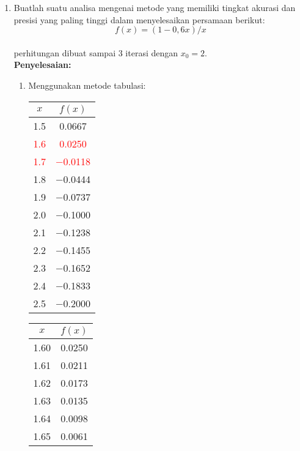 \documentclass{article}
\newcommand{\penyelesaian}{\textbf{Penyelesaian: }}
\begin{document}
\begin{enumerate}
    \item Buatlah suatu analisa mengenai metode yang memiliki tingkat akurasi dan presisi yang paling tinggi dalam menyelesaikan persamaan berikut: \\
    \begin{equation*}
        f(x) = (1 - 0,6x) / x
    \end{equation*} \\
    perhitungan dibuat sampai 3 iterasi dengan $x_0 = 2$. \\
    \penyelesaian 
    \begin{enumerate}
        \item Menggunakan metode tabulasi: \\
        \begin{tabular}{|c|c|}
            \hline
            $x$   & $f(x)$ \\
            \hline
            \num{1,5} & \num{0,0667} \\
            \textcolor{red}{\num{1,6}} & \textcolor{red}{\num{0,0250}} \\
            \textcolor{red}{\num{1,7}} & \textcolor{red}{\num{-0,0118}} \\
            \num{1,8} & \num{-0,0444} \\
            \num{1,9} & \num{-0,0737} \\
            \num{2,0} & \num{-0,1000} \\
            \num{2,1} & \num{-0,1238} \\
            \num{2,2} & \num{-0,1455} \\
            \num{2,3} & \num{-0,1652} \\
            \num{2,4} & \num{-0,1833} \\
            \num{2,5} & \num{-0,2000} \\
            \hline
            \end{tabular}\quad
            \begin{tabular}{|c|c|}
            \hline
            $x$   & $f(x)$ \\
            \hline
            \num{1,60} & \num{0,0250} \\
            \num{1,61} & \num{0,0211} \\
            \num{1,62} & \num{0,0173} \\
            \num{1,63} & \num{0,0135} \\
            \num{1,64} & \num{0,0098} \\
            \num{1,65} & \num{0,0061} \\

\end{tabular}
\end{enumerate}
\end{enumerate}
\end{document}
